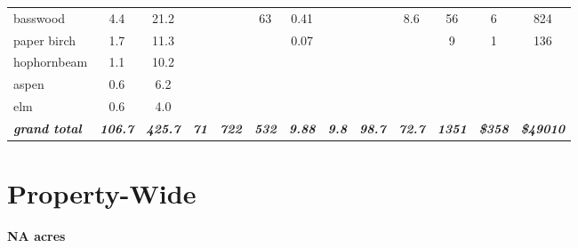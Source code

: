\documentclass[landscape]{article}
\begin{document}
\begin{table}[H]
\begin{tabular}[t]{lcccccccccccc}
basswood & 4.4 & 21.2 &  &  & 63 & 0.41 &  &  & 8.6 & 56 & 6 & 824\\
 
\rowcolor{gray!6}  paper birch & 1.7 & 11.3 &  &  &  & 0.07 &  &  &  & 9 & 1 & 136\\
 
hophornbeam & 1.1 & 10.2 &  &  &  &  &  &  &  &  &  & \\
 
\rowcolor{gray!6}  aspen & 0.6 & 6.2 &  &  &  &  &  &  &  &  &  & \\
 
elm & 0.6 & 4.0 &  &  &  &  &  &  &  &  &  & \\
 
\rowcolor{gray!6}  \rowcolor[HTML]{DCDCDC}  \em{\textbf{grand total}} & \em{\textbf{106.7}} & \em{\textbf{425.7}} & \em{\textbf{71}} & \em{\textbf{722}} & \em{\textbf{532}} & \em{\textbf{9.88}} & \em{\textbf{9.8}} & \em{\textbf{98.7}} & \em{\textbf{72.7}} & \em{\textbf{1351}} & \em{\textbf{\$358}} & \em{\textbf{\$49010}}\\
\bottomrule
\end{tabular}
\end{table}

\pagebreak

\section{Property-Wide}\label{property-wide}

\textbf{NA acres}
\end{document}
